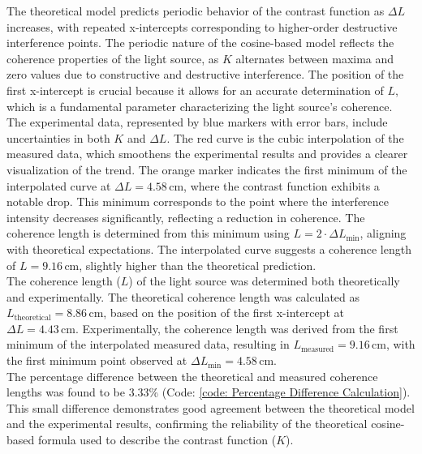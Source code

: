 \documentclass[a4paper,11pt]{article}
\begin{document}
The theoretical model predicts periodic behavior of the contrast function as \( \Delta L \) increases, with repeated x-intercepts corresponding to higher-order destructive interference points. The periodic nature of the cosine-based model reflects the coherence properties of the light source, as \( K \) alternates between maxima and zero values due to constructive and destructive interference. The position of the first x-intercept is crucial because it allows for an accurate determination of \( L \), which is a fundamental parameter characterizing the light source's coherence.\\

The experimental data, represented by blue markers with error bars, include uncertainties in both \( K \) and \( \Delta L \). The red curve is the cubic interpolation of the measured data, which smoothens the experimental results and provides a clearer visualization of the trend. The orange marker indicates the first minimum of the interpolated curve at \( \Delta L = 4.58 \, \text{cm} \), where the contrast function exhibits a notable drop. This minimum corresponds to the point where the interference intensity decreases significantly, reflecting a reduction in coherence. The coherence length is determined from this minimum using \( L = 2 \cdot \Delta L_{\text{min}} \), aligning with theoretical expectations. The interpolated curve suggests a coherence length of \( L = 9.16 \, \text{cm} \), slightly higher than the theoretical prediction.\\

The coherence length (\( L \)) of the light source was determined both theoretically and experimentally. The theoretical coherence length was calculated as \( L_{\text{theoretical}} = 8.86 \, \text{cm} \), based on the position of the first x-intercept at \( \Delta L = 4.43 \, \text{cm} \). Experimentally, the coherence length was derived from the first minimum of the interpolated measured data, resulting in \( L_{\text{measured}} = 9.16 \, \text{cm} \), with the first minimum point observed at \( \Delta L_{\text{min}} = 4.58 \, \text{cm} \).\\

The percentage difference between the theoretical and measured coherence lengths was found to be 3.33\% (Code: \autoref{code: Percentage Difference Calculation}). This small difference demonstrates good agreement between the theoretical model and the experimental results, confirming the reliability of the theoretical cosine-based formula used to describe the contrast function (\( K \)).\\
\end{document}
